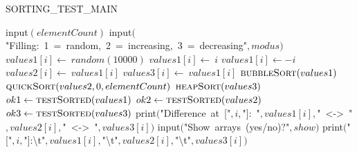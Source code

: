 \documentclass[a4paper,10pt]{article}
\begin{document}
\begin{algorithm}
\caption{SORTING\_TEST\_MAIN}
\begin{algorithmic}[5]
\State {}
\State {}
\State {}
\State {}
  \Repeat
    \State \(\)input\((elementCount)\)
  \Repeat
    \State \(\)input\((\)"{}Filling:\ 1\ =\ random,\ 2\ =\ increasing,\ 3\ =\ decreasing"{}\(,modus)\)
        \State \(values1[i]\gets\ random(10000)\)
      \EndSelector
        \State \(values1[i]\gets\ i\)
      \EndSelector
        \State \(values1[i]\gets-i\)
      \EndSelector
    \EndCase
  \EndFor
    \State \(values2[i]\gets\ values1[i]\)
    \State \(values3[i]\gets\ values1[i]\)
  \EndFor
  \Para
      \State \(\Call{bubbleSort}{values1}\)
      \State \(\Call{quickSort}{values2,0,elementCount}\)
      \State \(\Call{heapSort}{values3}\)
  \EndPara
  \State \(ok1\gets\Call{testSorted}{values1}\)
  \State \(ok2\gets\Call{testSorted}{values2}\)
  \State \(ok3\gets\Call{testSorted}{values3}\)
        \State \(\)print\((\)"{}Difference\ at\ ["{}\(,i,\)"{}]:\ "{}\(,values1[i],\)"{}\ \textless-\textgreater\ "{}\(,values2[i],\)"{}\ \textless-\textgreater\ "{}\(,values3[i])\)
      \EndIf
    \EndFor
  \EndIf
  \Repeat
    \State \(\)input\((\)"{}Show\ arrays\ (yes/no)?"{}\(,show)\)
      \State \(\)print\((\)"{}["{}\(,i,\)"{}]:\textbackslash{}t"{}\(,values1[i],\)"{}\textbackslash{}t"{}\(,values2[i],\)"{}\textbackslash{}t"{}\(,values3[i])\)
    \EndFor
  \EndIf
\EndProcedure
\end{algorithmic}
\end{algorithm}
\end{document}
